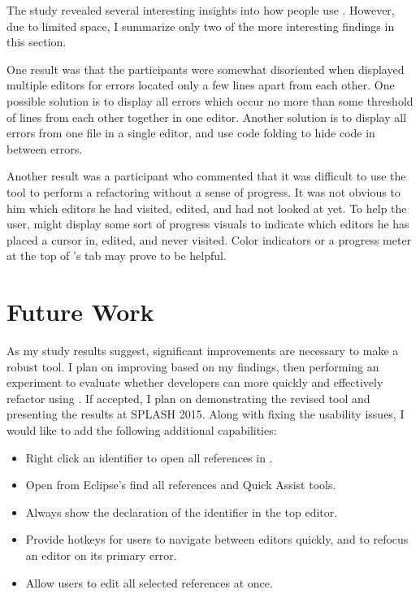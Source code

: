 \documentclass{sigplanconf}
\begin{document}
The study revealed several interesting insights into how people use \pname{}.
However, due to limited space, I summarize only two of the more interesting
findings in this section.

One result was that the participants were somewhat disoriented when \pname{}
displayed multiple editors for errors located only a few lines apart from each
other. One possible solution is to display all errors which
occur no more than some threshold of lines from each other together in one
editor. Another solution is to display all errors from one file in a single
editor, and use code folding to hide code in between errors.

Another result was a participant who commented that it was difficult to use the
tool to perform a refactoring without a sense of progress. It was not obvious to
him which editors he had visited, edited, and had not looked at yet.  To help
the user, \pname{} might display some sort of progress visuals to indicate which
editors he has placed a cursor in, edited, and never visited.  Color indicators
or a progress meter at the top of \pname{}'s tab may prove to be helpful.

\section{Future Work}
As my study results suggest, significant improvements are necessary to make
\pname{} a robust tool. I plan on improving \pname{} based on my findings, then
performing an experiment to evaluate whether developers can more quickly and
effectively refactor using \pname{}. If accepted, I plan on demonstrating the
revised tool and presenting the results at SPLASH 2015. Along with fixing the
usability issues, I would like to add the following additional capabilities:

\begin{itemize}
  \item Right click an identifier to open all references in \pname{}.
  \item Open \pname{} from Eclipse's find all references and Quick Assist tools.
  \item Always show the declaration of the identifier in the top editor.
  \item Provide hotkeys for users to navigate between editors quickly, and to
      refocus an editor on its primary error.
  \item Allow users to edit all selected references at once.
\end{itemize}
\end{document}
